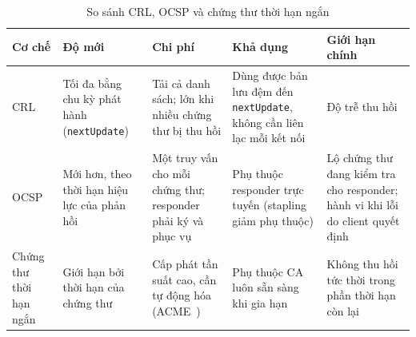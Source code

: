 \begin{table}[!htbp]
\centering
\small
\renewcommand{\arraystretch}{0.98}
\begin{tabularx}{\textwidth}{>{\raggedright\arraybackslash}p{2.2cm}>{\raggedright\arraybackslash}p{2.6cm}>{\raggedright\arraybackslash}X>{\raggedright\arraybackslash}X>{\raggedright\arraybackslash}p{3.0cm}}
\toprule
\textbf{Cơ chế} & \textbf{Độ mới} & \textbf{Chi phí} & \textbf{Khả dụng} & \textbf{Giới hạn chính} \\
\midrule
CRL & Tối đa bằng chu kỳ phát hành (\texttt{nextUpdate}) & Tải cả danh sách; lớn khi nhiều chứng thư bị thu hồi & Dùng được bản lưu đệm đến \texttt{nextUpdate}, không cần liên lạc mỗi kết nối & Độ trễ thu hồi \\
\midrule
OCSP & Mới hơn, theo thời hạn hiệu lực của phản hồi & Một truy vấn cho mỗi chứng thư; responder phải ký và phục vụ & Phụ thuộc responder trực tuyến (stapling giảm phụ thuộc) & Lộ chứng thư đang kiểm tra cho responder; hành vi khi lỗi do client quyết định \\
\midrule
Chứng thư thời hạn ngắn & Giới hạn bởi thời hạn của chứng thư & Cấp phát tần suất cao, cần tự động hóa (ACME~\cite{rfc8555}) & Phụ thuộc CA luôn sẵn sàng khi gia hạn & Không thu hồi tức thời trong phần thời hạn còn lại \\
\bottomrule
\end{tabularx}
\caption{So sánh CRL, OCSP và chứng thư thời hạn ngắn}
\label{tab:revocation-vs-shortlived}
\end{table}
